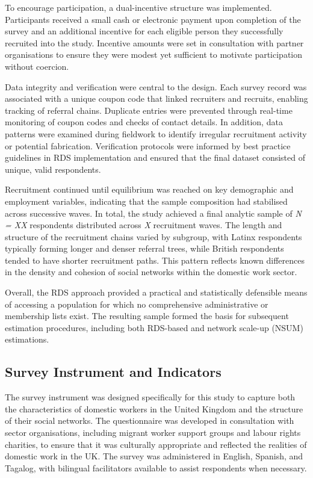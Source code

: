 \documentclass[
  12pt,
  letterpaper,
  DIV=11,
  numbers=noendperiod]{scrartcl}
\theoremstyle{plain}
\theoremstyle{definition}
\begin{document}
To encourage participation, a dual-incentive structure was implemented.
Participants received a small cash or electronic payment upon completion
of the survey and an additional incentive for each eligible person they
successfully recruited into the study. Incentive amounts were set in
consultation with partner organisations to ensure they were modest yet
sufficient to motivate participation without coercion.

Data integrity and verification were central to the design. Each survey
record was associated with a unique coupon code that linked recruiters
and recruits, enabling tracking of referral chains. Duplicate entries
were prevented through real-time monitoring of coupon codes and checks
of contact details. In addition, data patterns were examined during
fieldwork to identify irregular recruitment activity or potential
fabrication. Verification protocols were informed by best practice
guidelines in RDS implementation and ensured that the final dataset
consisted of unique, valid respondents.

Recruitment continued until equilibrium was reached on key demographic
and employment variables, indicating that the sample composition had
stabilised across successive waves. In total, the study achieved a final
analytic sample of \emph{N = XX} respondents distributed across \emph{X}
recruitment waves. The length and structure of the recruitment chains
varied by subgroup, with Latinx respondents typically forming longer and
denser referral trees, while British respondents tended to have shorter
recruitment paths. This pattern reflects known differences in the
density and cohesion of social networks within the domestic work sector.

Overall, the RDS approach provided a practical and statistically
defensible means of accessing a population for which no comprehensive
administrative or membership lists exist. The resulting sample formed
the basis for subsequent estimation procedures, including both RDS-based
and network scale-up (NSUM) estimations.

\subsection{Survey Instrument and
Indicators}\label{survey-instrument-and-indicators}

The survey instrument was designed specifically for this study to
capture both the characteristics of domestic workers in the United
Kingdom and the structure of their social networks. The questionnaire
was developed in consultation with sector organisations, including
migrant worker support groups and labour rights charities, to ensure
that it was culturally appropriate and reflected the realities of
domestic work in the UK. The survey was administered in English,
Spanish, and Tagalog, with bilingual facilitators available to assist
respondents when necessary.
\end{document}
